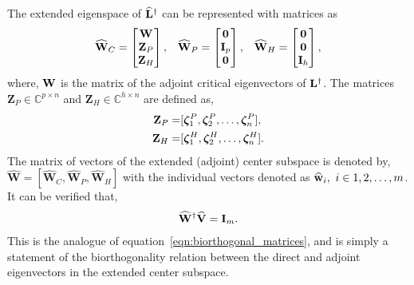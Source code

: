 The extended eigenspace of $\mathbf{\widehat{L}}^{\dagger}$ can be represented with matrices as 
\begin{align}
	\label{eqn:extended_adjoint_tangent_space}
	\widehat{\mathbf{W}}_{C} = \begin{bmatrix}
		\mathbf{W} \\
		\mathbf{Z}_{P} \\
		\mathbf{Z}_{H}
	\end{bmatrix}, &&
	\widehat{\mathbf{W}}_{P} = \begin{bmatrix}
		\mathbf{0} \\
		\mathbf{I}_{p} \\
		\mathbf{0}
	\end{bmatrix}, &&
	\widehat{\mathbf{W}}_{H} = \begin{bmatrix}
		\mathbf{0} \\
		\mathbf{0} \\
		\mathbf{I}_{h}
	\end{bmatrix},
\end{align}
where, $\mathbf{W}$ is the matrix of the adjoint critical eigenvectors of $\mathbf{L}^{\dagger}$. The matrices $\mathbf{Z}_{P}\in\mathds{C}^{p\times n}$ and $\mathbf{Z}_{H}\in\mathds{C}^{h\times n}$ are defined as,
\begin{subequations}
	\label{eqn:adjoint_vectors_zeta}
\begin{align}
	\mathbf{Z}_{P} =& [\boldsymbol{\zeta}^{P}_{1}, \boldsymbol{\zeta}^{P}_{2},\ldots,\boldsymbol{\zeta}^{P}_{n}], \\
	\mathbf{Z}_{H} =& [\boldsymbol{\zeta}^{H}_{1}, \boldsymbol{\zeta}^{H}_{2},\ldots,\boldsymbol{\zeta}^{H}_{n}].
\end{align}
\end{subequations}
The matrix of vectors of the extended (adjoint) center subspace is denoted by, $\mathbf{\widehat{W}} = [\mathbf{\widehat{W}}_{C}, \mathbf{\widehat{W}}_{P}, \mathbf{\widehat{W}}_{H}]$ with the individual vectors denoted as $\widehat{\mathbf{w}}_{i},\ i\in 1,2,\ldots,m$. It can be verified that,
\begin{align}
	\label{eqn:extended_biorthogonal_matrices}
	\widehat{\mathbf{W}}^{\dagger}\widehat{\mathbf{V}} = \mathbf{I}_{m}.
\end{align}
This is the analogue of equation~\eqref{eqn:biorthogonal_matrices}, and is simply a statement of the biorthogonality relation between the direct and adjoint eigenvectors in the extended center subspace. 

